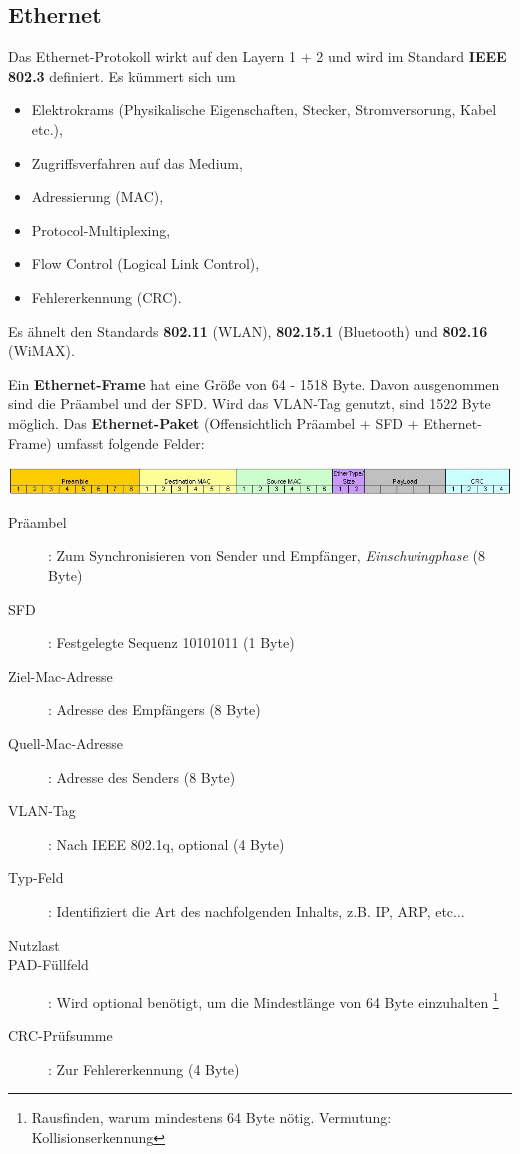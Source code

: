 \documentclass{article} %
\begin{document}
\subsection{Ethernet}
\label{subsec:ethernet}
Das Ethernet-Protokoll wirkt auf den Layern 1 + 2 und wird im Standard \textbf{IEEE 802.3} definiert.
Es kümmert sich um 
	\begin{itemize}		
		\item Elektrokrams (Physikalische Eigenschaften, Stecker, Stromversorung, Kabel etc.),
		\item Zugriffsverfahren auf das Medium,
		\item Adressierung (MAC),
		\item Protocol-Multiplexing,
		\item Flow Control (Logical Link Control),
		\item Fehlererkennung (CRC). 
	\end{itemize}
Es ähnelt den Standards \textbf{802.11} (WLAN), \textbf{802.15.1} (Bluetooth) und \textbf{802.16} (WiMAX).

Ein \textbf{Ethernet-Frame} hat eine Größe von 64 - 1518 Byte.
Davon ausgenommen sind die Präambel und der SFD.
Wird das VLAN-Tag genutzt, sind 1522 Byte möglich.
Das \textbf{Ethernet-Paket} (Offensichtlich Präambel + SFD + Ethernet-Frame) umfasst folgende Felder:

\includegraphics[width=16cm]{img/EthernetFrame.jpg}

\begin{description}
	\item[Präambel]: Zum Synchronisieren von Sender und Empfänger, \emph{Einschwingphase} (8 Byte)
	\item[SFD]: Festgelegte Sequenz 10101011 (1 Byte)
	\item[Ziel-Mac-Adresse]: Adresse des Empfängers (8 Byte)
	\item[Quell-Mac-Adresse]: Adresse des Senders (8 Byte)
	\item[VLAN-Tag]: Nach IEEE 802.1q, optional (4 Byte)
	\item[Typ-Feld]: Identifiziert die Art des nachfolgenden Inhalts, z.B. IP, ARP, etc...
	\item[Nutzlast]
	\item[PAD-Füllfeld]: Wird optional benötigt, um die Mindestlänge von 64 Byte einzuhalten \footnote{Rausfinden, warum mindestens 64 Byte nötig. Vermutung: Kollisionserkennung}
	\item[CRC-Prüfsumme]: Zur Fehlererkennung (4 Byte)
\end{description}
\end{document}
